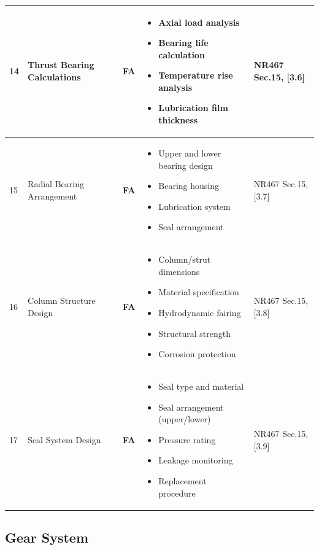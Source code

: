 \documentclass[11pt,a4paper]{report}
\newcommand{\fa}{\textbf{\textcolor{warningred}{FA}}}
\begin{document}
\begin{longtable}{|p{0.5cm}|p{5cm}|p{1.5cm}|p{5.5cm}|p{2cm}|}
14 & Thrust Bearing Calculations & \fa{} & 
\begin{itemize}[leftmargin=*,nosep]
\item Axial load analysis
\item Bearing life calculation
\item Temperature rise analysis
\item Lubrication film thickness
\end{itemize} & NR467 Sec.15, [3.6] \\
\hline

15 & Radial Bearing Arrangement & \fa{} & 
\begin{itemize}[leftmargin=*,nosep]
\item Upper and lower bearing design
\item Bearing housing
\item Lubrication system
\item Seal arrangement
\end{itemize} & NR467 Sec.15, [3.7] \\
\hline

16 & Column Structure Design & \fa{} & 
\begin{itemize}[leftmargin=*,nosep]
\item Column/strut dimensions
\item Material specification
\item Hydrodynamic fairing
\item Structural strength
\item Corrosion protection
\end{itemize} & NR467 Sec.15, [3.8] \\
\hline

17 & Seal System Design & \fa{} & 
\begin{itemize}[leftmargin=*,nosep]
\item Seal type and material
\item Seal arrangement (upper/lower)
\item Pressure rating
\item Leakage monitoring
\item Replacement procedure
\end{itemize} & NR467 Sec.15, [3.9] \\
\hline

\end{longtable}

\subsection{Gear System}
\end{document}
